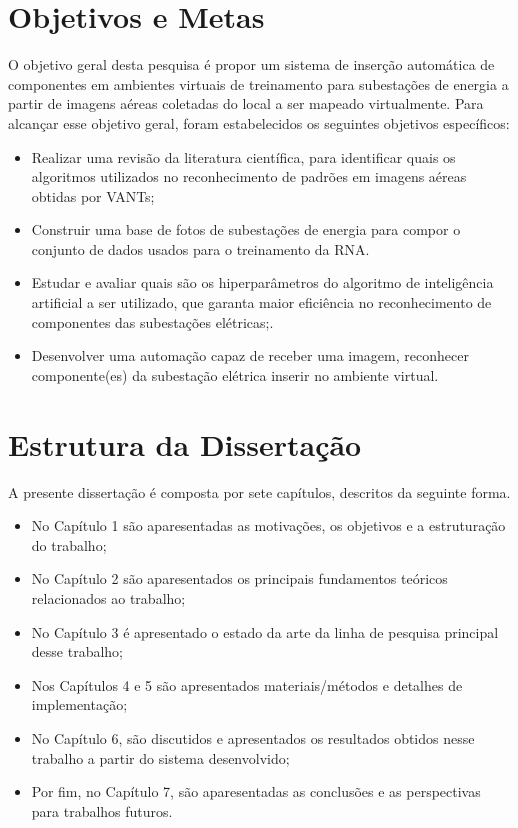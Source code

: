 \section{Objetivos e Metas}

O objetivo geral desta pesquisa é propor um sistema de inserção automática de componentes em ambientes virtuais de treinamento para subestações de energia a partir  de imagens aéreas coletadas do local a ser mapeado virtualmente. Para alcançar esse objetivo geral, foram estabelecidos os seguintes objetivos específicos:

\begin{itemize}
\item Realizar uma revisão da literatura científica, para identificar quais os algoritmos utilizados no reconhecimento de padrões em imagens aéreas obtidas por VANTs;
\item Construir uma base de fotos de subestações de energia para compor o conjunto de dados usados para o treinamento da RNA.
\item Estudar e avaliar quais são os hiperparâmetros do algoritmo de inteligência artificial a ser utilizado, que garanta maior eficiência no reconhecimento de componentes das subestações elétricas;.
\item Desenvolver uma automação capaz de receber uma imagem, reconhecer componente(es) da subestação elétrica inserir no ambiente virtual.
\end{itemize}

\section{Estrutura da Dissertação}

A presente dissertação é composta por sete capítulos, descritos da seguinte forma.
\begin{itemize}
\item No Capítulo 1 são aparesentadas as motivações, os objetivos e a estruturação do trabalho;
\item No Capítulo 2 são aparesentados os principais fundamentos teóricos relacionados ao trabalho;
\item No Capítulo 3 é apresentado o estado da arte da linha de pesquisa principal desse trabalho;
\item Nos Capítulos 4 e 5 são apresentados materiais/métodos e detalhes de implementação;
\item No Capítulo 6, são discutidos e apresentados os resultados obtidos nesse trabalho a partir do sistema desenvolvido;
\item Por fim, no Capítulo 7, são aparesentadas as conclusões e as perspectivas para trabalhos futuros.
\end{itemize}

